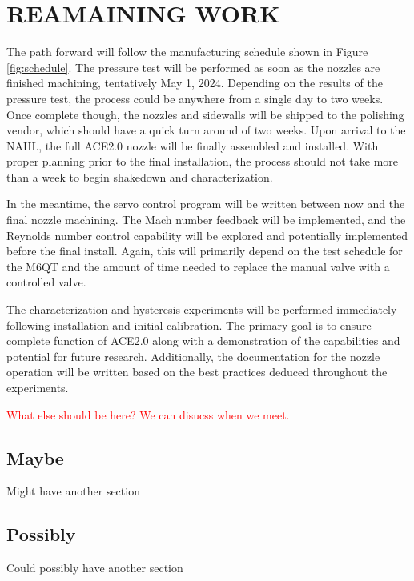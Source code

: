 %
%  
%

\chapter{REAMAINING WORK}

The path forward will follow the manufacturing schedule shown in Figure \ref{fig:schedule}. The pressure test will be performed as soon as the nozzles are finished machining, tentatively May 1, 2024. Depending on the results of the pressure test, the process could be anywhere from a single day to two weeks. Once complete though, the nozzles and sidewalls will be shipped to the polishing vendor, which should have a quick turn around of two weeks. Upon arrival to the NAHL, the full ACE2.0 nozzle will be finally assembled and installed. With proper planning prior to the final installation, the process should not take more than a week to begin shakedown and characterization.

In the meantime, the servo control program will be written between now and the final nozzle machining. The Mach number feedback will be implemented, and the Reynolds number control capability will be explored and potentially implemented before the final install. Again, this will primarily depend on the test schedule for the M6QT and the amount of time needed to replace the manual valve with a controlled valve. 

The characterization and hysteresis experiments will be performed immediately following installation and initial calibration. The primary goal is to ensure complete function of ACE2.0 along with a demonstration of the capabilities and potential for future research. Additionally, the documentation for the nozzle operation will be written based on the best practices deduced throughout the experiments.

\textcolor{red}{What else should be here? We can disucss when we meet.}

\section{Maybe}

Might have another section

\section{Possibly}

Could possibly have another section


\nocite{anderson-fundamentals}
\nocite{anderson-compressible}
